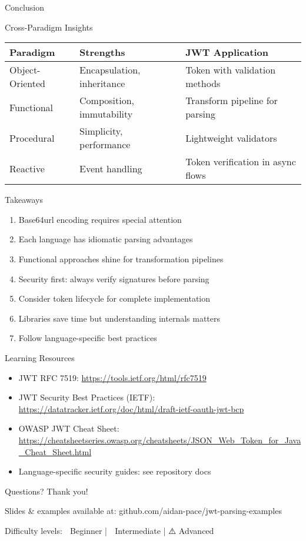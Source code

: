 \documentclass[presentation,aspectratio=169]{beamer}
\begin{document}
\begin{frame}[label={sec:org52354a6}]{Conclusion}
\begin{block}{Cross-Paradigm Insights}
\begin{center}
\begin{tabular}{lll}
Paradigm & Strengths & JWT Application\\
\hline
Object-Oriented & Encapsulation, inheritance & Token with validation methods\\
Functional & Composition, immutability & Transform pipeline for parsing\\
Procedural & Simplicity, performance & Lightweight validators\\
Reactive & Event handling & Token verification in async flows\\
\end{tabular}
\end{center}
\end{block}
\begin{block}{Takeaways}
\begin{enumerate}[<+->]
\item Base64url encoding requires special attention
\item Each language has idiomatic parsing advantages
\item Functional approaches shine for transformation pipelines
\item Security first: always verify signatures before parsing
\item Consider token lifecycle for complete implementation
\item Libraries save time but understanding internals matters
\item Follow language-specific best practices
\end{enumerate}
\end{block}
\begin{block}{Learning Resources}
\begin{itemize}[<+->]
\item JWT RFC 7519: \url{https://tools.ietf.org/html/rfc7519}
\item JWT Security Best Practices (IETF): \url{https://datatracker.ietf.org/doc/html/draft-ietf-oauth-jwt-bcp}
\item OWASP JWT Cheat Sheet: \url{https://cheatsheetseries.owasp.org/cheatsheets/JSON\_Web\_Token\_for\_Java\_Cheat\_Sheet.html}
\item Language-specific security guides: see repository docs
\end{itemize}
\end{block}
\begin{block}{Questions?}
Thank you!

\alert{Slides \& examples available at:} 
github.com/aidan-pace/jwt-parsing-examples

\alert{Difficulty levels:} 🔰 Beginner | 🧩 Intermediate | ⚠️ Advanced
\end{block}
\end{frame}
\end{document}
